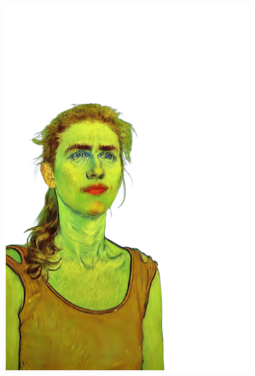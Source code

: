 \begin{figure}[ht]
\begin{subfigure}{0.08\linewidth}
        \includegraphics[width=\textwidth]{Figures/results/high/dora_vangogh/11_render.png}

\end{subfigure}
\end{figure}
